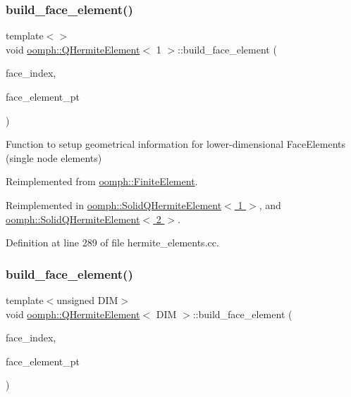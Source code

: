 \subsubsection{\texorpdfstring{build\+\_\+face\+\_\+element()}{build\_face\_element()}\hspace{0.1cm}{\footnotesize\ttfamily [1/3]}}
{\footnotesize\ttfamily template$<$$>$ \\
void \hyperlink{classoomph_1_1QHermiteElement}{oomph\+::\+Q\+Hermite\+Element}$<$ 1 $>$\+::build\+\_\+face\+\_\+element (\begin{DoxyParamCaption}\item[{const int \&}]{face\+\_\+index,  }\item[{\hyperlink{classoomph_1_1FaceElement}{Face\+Element} $\ast$}]{face\+\_\+element\+\_\+pt }\end{DoxyParamCaption})\hspace{0.3cm}{\ttfamily [virtual]}}

Function to setup geometrical information for lower-\/dimensional Face\+Elements (single node elements) 

Reimplemented from \hyperlink{classoomph_1_1FiniteElement_aaf7bead5b462cfd5401d97b3dbdc7af7}{oomph\+::\+Finite\+Element}.



Reimplemented in \hyperlink{classoomph_1_1SolidQHermiteElement_a4e81780865998f59277d7424217ec7c1}{oomph\+::\+Solid\+Q\+Hermite\+Element$<$ 1 $>$}, and \hyperlink{classoomph_1_1SolidQHermiteElement_a4e81780865998f59277d7424217ec7c1}{oomph\+::\+Solid\+Q\+Hermite\+Element$<$ 2 $>$}.



Definition at line 289 of file hermite\+\_\+elements.\+cc.

\mbox{\label{classoomph_1_1QHermiteElement_a796c8d180b039c5e753b373ba7aa720a}} 
\subsubsection{\texorpdfstring{build\+\_\+face\+\_\+element()}{build\_face\_element()}\hspace{0.1cm}{\footnotesize\ttfamily [2/3]}}
{\footnotesize\ttfamily template$<$unsigned D\+IM$>$ \\
void \hyperlink{classoomph_1_1QHermiteElement}{oomph\+::\+Q\+Hermite\+Element}$<$ D\+IM $>$\+::build\+\_\+face\+\_\+element (\begin{DoxyParamCaption}\item[{const int \&}]{face\+\_\+index,  }\item[{\hyperlink{classoomph_1_1FaceElement}{Face\+Element} $\ast$}]{face\+\_\+element\+\_\+pt }\end{DoxyParamCaption})\hspace{0.3cm}{\ttfamily [virtual]}}



